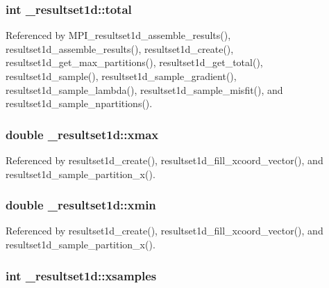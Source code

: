 \subsubsection[{\texorpdfstring{total}{total}}]{\setlength{\rightskip}{0pt plus 5cm}int \+\_\+resultset1d\+::total}\hypertarget{struct__resultset1d_a223c023b104e0d389437bf5f27373b93}{}\label{struct__resultset1d_a223c023b104e0d389437bf5f27373b93}


Referenced by M\+P\+I\+\_\+resultset1d\+\_\+assemble\+\_\+results(), resultset1d\+\_\+assemble\+\_\+results(), resultset1d\+\_\+create(), resultset1d\+\_\+get\+\_\+max\+\_\+partitions(), resultset1d\+\_\+get\+\_\+total(), resultset1d\+\_\+sample(), resultset1d\+\_\+sample\+\_\+gradient(), resultset1d\+\_\+sample\+\_\+lambda(), resultset1d\+\_\+sample\+\_\+misfit(), and resultset1d\+\_\+sample\+\_\+npartitions().

\subsubsection[{\texorpdfstring{xmax}{xmax}}]{\setlength{\rightskip}{0pt plus 5cm}double \+\_\+resultset1d\+::xmax}\hypertarget{struct__resultset1d_aafe77a040d0426b81801841b28b97352}{}\label{struct__resultset1d_aafe77a040d0426b81801841b28b97352}


Referenced by resultset1d\+\_\+create(), resultset1d\+\_\+fill\+\_\+xcoord\+\_\+vector(), and resultset1d\+\_\+sample\+\_\+partition\+\_\+x().

\subsubsection[{\texorpdfstring{xmin}{xmin}}]{\setlength{\rightskip}{0pt plus 5cm}double \+\_\+resultset1d\+::xmin}\hypertarget{struct__resultset1d_abb880fc6318a6e920a24129a0f69713e}{}\label{struct__resultset1d_abb880fc6318a6e920a24129a0f69713e}


Referenced by resultset1d\+\_\+create(), resultset1d\+\_\+fill\+\_\+xcoord\+\_\+vector(), and resultset1d\+\_\+sample\+\_\+partition\+\_\+x().

\subsubsection[{\texorpdfstring{xsamples}{xsamples}}]{\setlength{\rightskip}{0pt plus 5cm}int \+\_\+resultset1d\+::xsamples}\hypertarget{struct__resultset1d_ad9d22c9f074c151990d84f79057b6a62}{}\label{struct__resultset1d_ad9d22c9f074c151990d84f79057b6a62}


